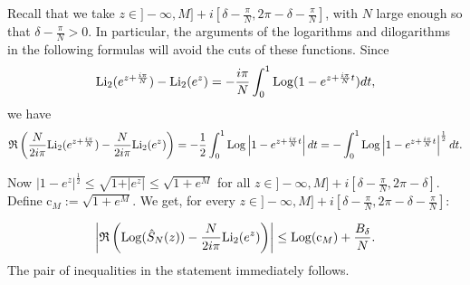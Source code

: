 \documentclass[11pt]{amsart}
\newcommand{\Log}{{\rm Log}}
\begin{document}
{Recall that we take $z\in ]-\infty,M] +i[\textstyle \delta-\frac{\pi}{N}, 2\pi-\delta-\frac{\pi}{N}]$, with $N$ large enough so that $\textstyle \delta-\frac{\pi}{N}>0$. In particular, the arguments of the logarithms and dilogarithms in the following formulas will avoid the cuts of these functions. Since
\begin{equation}\label{Taylor0}
{\rm Li_2}(e^{z+\frac{i\pi}{N}}) - {\rm Li_2}(e^{z}) = - \frac{i\pi}{N} \int_0^1 \Log(1-e^{z+\frac{i\pi}{N}t}) dt,
\end{equation}
we have
$$ \mathfrak{R}\left(\frac{N}{2i\pi}{\rm Li_2}(e^{z+\frac{i\pi}{N}})
- \frac{N}{2i\pi}{\rm Li_2}(e^{z})\right) = - \frac{1}{2} \int_0^1 \Log\left\vert 1-e^{z+\frac{i\pi}{N}t}\right\vert dt
= -  \int_0^1 \Log\left\vert 1-e^{z+\frac{i\pi}{N}t}\right\vert^{\frac{1}{2}} dt. $$

Now $\vert 1-e^z\vert^{\frac{1}{2}}\leq \sqrt{1+ \vert e^z\vert} \leq \sqrt{1+e^M}$ for all $\textstyle z\in ]-\infty,M] +i[\delta-\frac{\pi}{N}, 2\pi-\delta]$. Define $\mathrm{c}_M:=\sqrt{1+e^M}$. We get, for every $z\in ]-\infty,M] +i[\textstyle \delta-\frac{\pi}{N}, 2\pi-\delta-\frac{\pi}{N}]$:

$$\left\vert \mathfrak{R}\left(\Log(\hat{S}_N(z)) -\frac{N}{2i\pi}{\rm Li_2}(e^{z})\right) \right\vert \leq \Log(\mathrm{c}_M) + \frac{B_\delta}{N}.$$
The pair of inequalities in the statement immediately follows. 


}
\end{document}
